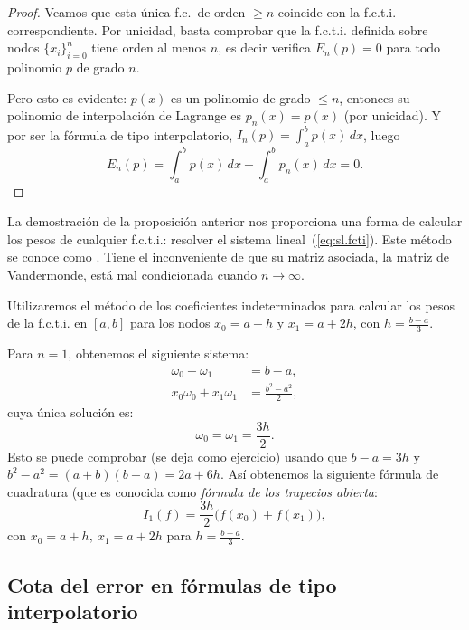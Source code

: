 \begin{proof}
   Veamos que esta única f.c.\ de orden $\ge n$ coincide con
  la f.c.t.i. correspondiente. Por unicidad, basta
  comprobar que la f.c.t.i. definida sobre nodos $\{x_i\}_{i=0}^n$
  tiene orden al menos $n$, es decir verifica $E_n(p)=0$ para todo
  polinomio $p$ de grado $n$.

  Pero esto es evidente: $p(x)$ es un polinomio de grado $\le n$,
  entonces su polinomio de interpolación de Lagrange es $p_n(x)=p(x)$
  (por unicidad).  Y por ser la fórmula de tipo interpolatorio,
  $I_n(p)=\int_a^b p(x)\,dx$, luego
  $$E_n(p)=\int_a^b p(x)\,dx - \int_a^b p_n(x)\,dx =0.$$
\end{proof}

\begin{remark}
  \label{rk:6}
  La demostración de la proposición anterior nos proporciona una forma
  de calcular los pesos de cualquier f.c.t.i.: resolver el sistema
lineal~(\ref{eq:sl.fcti}). Este método se conoce como . Tiene el inconveniente de que su
matriz asociada, la matriz de Vandermonde, está mal condicionada
  cuando $n\to\infty$.
\end{remark}

\begin{example}
  \label{ex:coef-indetermin:formula-trapecios-abierta}
  Utilizaremos el método de los coeficientes indeterminados para
  calcular los pesos de la f.c.t.i. en $[a,b]$ para los nodos
  $x_0=a+h$ y $x_1=a+2h$, con $h=\frac{b-a}{3}$.

  Para $n=1$, obtenemos el siguiente sistema:
  \begin{align*}
    \omega_0 + \omega_1 &= b-a,
    \\
    x_0\omega_0 + x_1\omega_1 &= \frac{b^2-a^2}{2},
  \end{align*}
  cuya única solución es:
  \begin{equation*}
    \omega_0=\omega_1=\frac{3h}{2}.
  \end{equation*}
  Esto se puede comprobar (se deja como ejercicio) usando
  que $b-a=3h$ y $b^2-a^2 = (a+b)(b-a)=2a + 6h$.
  Así obtenemos la siguiente fórmula de cuadratura (que es conocida
  como \textit{fórmula de los trapecios abierta}:
  \begin{equation*}
    I_1(f)=\frac{3h}{2}
    \big(
      f(x_0)+f(x_1)
    \big),
  \end{equation*}
  con $x_0=a+h, \ x_1=a+2h$ para $h=\frac{b-a}{3}$.
\end{example}

\subsection*{Cota del error en fórmulas de tipo interpolatorio}

